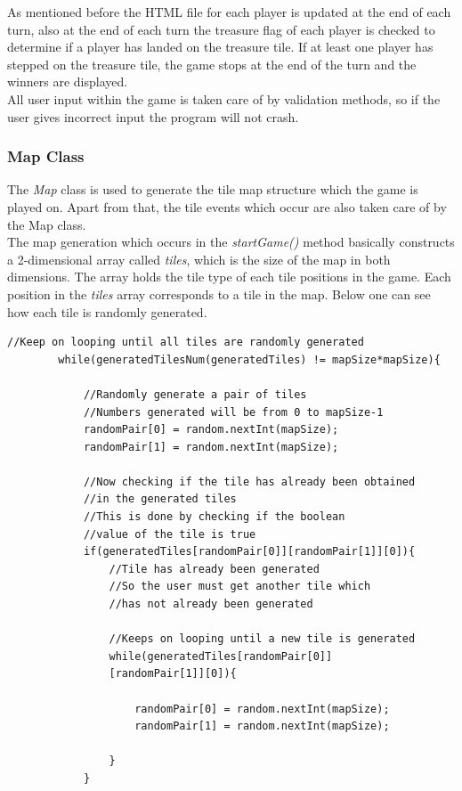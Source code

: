 \documentclass[a4paper,12pt]{extarticle}
\begin{document}
\noindent As mentioned before the HTML file for each player is updated at the end of each turn, also at the end of each turn the treasure flag of each player is checked to determine if a player has landed on the treasure tile. If at least one player has stepped on the treasure tile, the game stops at the end of the turn and the winners are displayed.\\

\noindent All user input within the game is taken care of by validation methods, so if the user gives incorrect input the program will not crash.\\
\newpage
\subsubsection{Map Class}
\noindent The \textit{Map} class is used to generate the tile map structure which the game is played on. Apart from that, the tile events which occur are also taken care of by the Map class.\\

\noindent The map generation which occurs in the \textit{startGame()} method basically constructs a 2-dimensional array called \textit{tiles}, which is the size of the map in both dimensions. The array holds the tile type of each tile positions in the game. Each position in the \textit{tiles} array corresponds to a tile in the map. Below one can see how each tile is randomly generated.

\begin{lstlisting}
//Keep on looping until all tiles are randomly generated
        while(generatedTilesNum(generatedTiles) != mapSize*mapSize){

            //Randomly generate a pair of tiles
            //Numbers generated will be from 0 to mapSize-1
            randomPair[0] = random.nextInt(mapSize);
            randomPair[1] = random.nextInt(mapSize);

            //Now checking if the tile has already been obtained 
            //in the generated tiles
            //This is done by checking if the boolean 
            //value of the tile is true
            if(generatedTiles[randomPair[0]][randomPair[1]][0]){
                //Tile has already been generated
                //So the user must get another tile which
                //has not already been generated

                //Keeps on looping until a new tile is generated
                while(generatedTiles[randomPair[0]]
                [randomPair[1]][0]){

                    randomPair[0] = random.nextInt(mapSize);
                    randomPair[1] = random.nextInt(mapSize);

                }
            }
\end{lstlisting}
\vspace{4mm}
\end{document}
